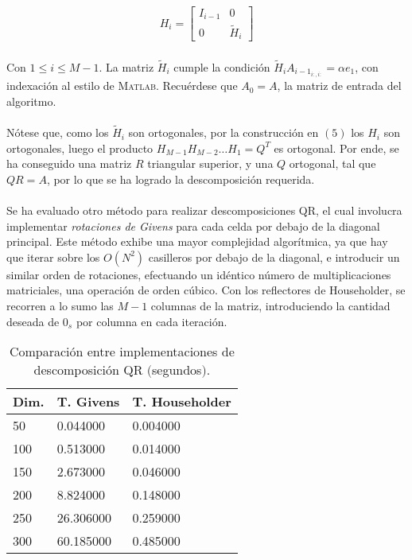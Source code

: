\documentclass[12pt, twocolumn]{article}
\begin{document}
	\begin{align}
	H_{i} = \begin{bmatrix} 
	I_{i-1} & 0 	   \\
	0 	   & \widetilde{H}_{i}         
	\end{bmatrix}
	\end{align}
	
	
	\paragraph{} Con $1 \le i \le M-1$. La matriz $\widetilde{H}_{i}$ cumple la condición $\widetilde{H}_{i}A_{i-1_{i:,i:}} = \alpha e_{1}$, con indexación al estilo de \textsc{Matlab}. Recuérdese que $A_{0} = A$, la matriz de entrada del algoritmo.
	
	\paragraph{} Nótese que, como los $\widetilde{H}_{i}$ son ortogonales, por la construcción en $(5)$ los $H_{i}$ son ortogonales, luego el producto $H_{M-1}H_{M-2}\dots H_{1} = Q^{T}$ es ortogonal. Por ende, se ha conseguido una matriz $R$ triangular superior, y una $Q$ ortogonal, tal que $QR = A$, por lo que se ha logrado la descomposición requerida. 
	
	\paragraph{} Se ha evaluado otro método para realizar descomposiciones QR, el cual involucra implementar \textit{rotaciones de Givens} para cada celda por debajo de la diagonal principal. Este método exhibe una mayor complejidad algorítmica, ya que hay que iterar sobre los $O(N^{2})$ casilleros por debajo de la diagonal, e introducir un similar orden de rotaciones, efectuando un idéntico número de multiplicaciones matriciales, una operación de orden cúbico. Con los reflectores de Householder, se recorren a lo sumo las $M-1$ columnas de la matriz, introduciendo la cantidad deseada de $0_{s}$ por columna en cada iteración.
	
	\begin{table}[!htb]
		\centering
		\label{qrcmp}
		\begin{tabular}{@{}lll@{}}
			\toprule
			Dim. & T. Givens & T. Householder \\ \midrule
			50        & 0.044000  & 0.004000       \\
			100       & 0.513000  & 0.014000       \\
			150       & 2.673000  & 0.046000       \\
			200       & 8.824000  & 0.148000       \\
			250       & 26.306000 & 0.259000       \\
			300       & 60.185000 & 0.485000       \\ \bottomrule
		\end{tabular}
		\caption{Comparación entre implementaciones de descomposición QR $($segundos$)$.}
	\end{table}
	
\end{document}

